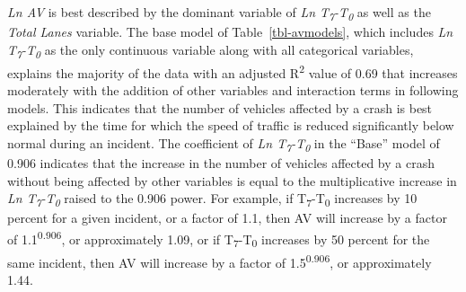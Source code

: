 \documentclass[
  letterpaper,
  authoryear]{elsarticle}
\begin{document}
\emph{Ln AV} is best described by the dominant variable of \emph{Ln
T\textsubscript{7}-T\textsubscript{0}} as well as the \emph{Total Lanes}
variable. The base model of Table~\ref{tbl-avmodels}, which includes
\emph{Ln T\textsubscript{7}-T\textsubscript{0}} as the only continuous
variable along with all categorical variables, explains the majority of
the data with an adjusted R\textsuperscript{2} value of 0.69 that
increases moderately with the addition of other variables and
interaction terms in following models. This indicates that the number of
vehicles affected by a crash is best explained by the time for which the
speed of traffic is reduced significantly below normal during an
incident. The coefficient of \emph{Ln
T\textsubscript{7}-T\textsubscript{0}} in the ``Base'' model of 0.906
indicates that the increase in the number of vehicles affected by a
crash without being affected by other variables is equal to the
multiplicative increase in \emph{Ln
T\textsubscript{7}-T\textsubscript{0}} raised to the 0.906 power. For
example, if T\textsubscript{7}-T\textsubscript{0} increases by 10
percent for a given incident, or a factor of 1.1, then AV will increase
by a factor of 1.1\textsuperscript{0.906}, or approximately 1.09, or if
T\textsubscript{7}-T\textsubscript{0} increases by 50 percent for the
same incident, then AV will increase by a factor of
1.5\textsuperscript{0.906}, or approximately 1.44.
\end{document}
